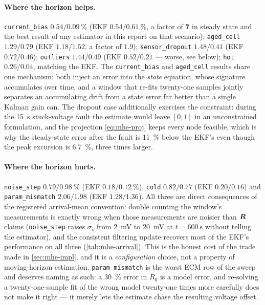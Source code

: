 \paragraph{Where the horizon helps.}  \texttt{current\_bias} $0.54/\SI{0.09}{\percent}$ (EKF
$0.54/\SI{0.61}{\percent}$, a factor of \textbf{7} in steady state and the best result of any
estimator in this report on that scenario); \texttt{aged\_cell} $1.29/0.79$ (EKF $1.18/1.52$, a
factor of $1.9$); \texttt{sensor\_dropout} $1.48/0.41$ (EKF $0.72/0.46$); \texttt{outliers}
$1.44/0.49$ (EKF $0.52/0.21$ --- worse, see below); \texttt{hot} $0.26/0.04$, matching the EKF.
The \texttt{current\_bias} and \texttt{aged\_cell} results share one mechanism: both inject an
error into the \emph{state} equation, whose signature accumulates over time, and a window that
re-fits twenty-one samples jointly separates an accumulating drift from a state error far better
than a single Kalman gain can.  The dropout case additionally exercises the constraint: during the
\SI{15}{\second} stuck-voltage fault the estimate would leave $[0,1]$ in an unconstrained
formulation, and the projection \cref{eq:mhe-proj} keeps every node feasible, which is why the
steady-state error after the fault is \SI{11}{\percent} below the EKF's even though the peak
excursion is \SI{6.7}{\percent}, three times larger.

\paragraph{Where the horizon hurts.}  \texttt{noise\_step} $0.79/\SI{0.98}{\percent}$ (EKF
$0.18/\SI{0.12}{\percent}$), \texttt{cold} $0.82/0.77$ (EKF $0.20/0.16$) and
\texttt{param\_mismatch} $2.06/1.98$ (EKF $1.28/1.36$).  All three are direct consequences of the
registered arrival-mean convention: double counting the window's measurements is exactly wrong when
those measurements are noisier than $\bm{R}$ claims (\texttt{noise\_step} raises $\sigma_v$ from
\SI{2}{\milli\volt} to \SI{20}{\milli\volt} at $t = \SI{600}{\second}$ without telling the
estimator), and the consistent filtering update recovers most of the EKF's performance on all three
(\cref{tab:mhe-arrival}).  This is the honest cost of the trade made in \cref{sec:mhe-impl}, and it
is a \emph{configuration} choice, not a property of moving-horizon estimation.
\texttt{param\_mismatch} is the worst ECM row of the sweep and deserves naming as such: a
\SI{30}{\percent} error in $R_0$ is a model error, and re-solving a twenty-one-sample fit of the
wrong model twenty-one times more carefully does not make it right --- it merely lets the estimate
chase the resulting voltage offset.

